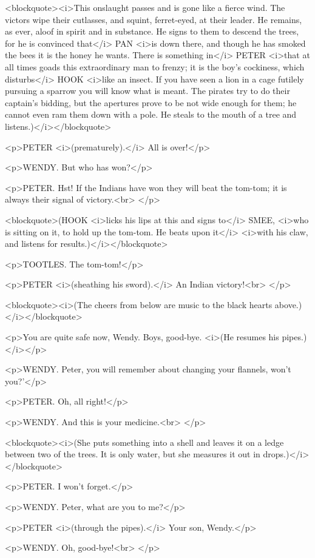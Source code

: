 <blockquote><i>This onslaught passes and is gone like a fierce wind.
The victors wipe their cutlasses, and squint, ferret-eyed, at their
leader. He remains, as ever, aloof in spirit and in substance. He
signs to them to descend the trees, for he is convinced that</i> PAN
<i>is down there, and though he has smoked the bees it is the honey
he wants. There is something in</i> PETER <i>that at all times goads
this extraordinary man to frenzy; it is the boy's cockiness, which
disturbs</i> HOOK <i>like an insect. If you have seen a lion in a
cage futilely pursuing a sparrow you will know what is meant. The
pirates try to do their captain's bidding, but the apertures prove to
be not wide enough for them; he cannot even ram them down with a
pole. He steals to the mouth of a tree and listens.)</i></blockquote>

<p>PETER <i>(prematurely).</i> All is over!</p>

<p>WENDY. But who has won?</p>

<p>PETER. Hst! If the Indians have won they will beat the tom-tom; it
is always their signal of victory.<br>
</p>

<blockquote>(HOOK <i>licks his lips at this and signs to</i> SMEE,
<i>who is sitting on it, to hold up the tom-tom. He beats upon it</i>
<i>with his claw, and listens for results.)</i></blockquote>

<p>TOOTLES. The tom-tom!</p>

<p>PETER <i>(sheathing his sword).</i> An Indian victory!<br>
</p>

<blockquote><i>(The cheers from below are music to the black hearts
above.)</i></blockquote>

<p>You are quite safe now, Wendy. Boys, good-bye. <i>(He resumes his
pipes.)</i></p>

<p>WENDY. Peter, you will remember about changing your flannels,
won't you?'</p>

<p>PETER. Oh, all right!</p>

<p>WENDY. And this is your medicine.<br>
</p>

<blockquote><i>(She puts something into a shell and leaves it on a
ledge between two of the trees. It is only water, but she measures it
out in drops.)</i></blockquote>

<p>PETER. I won't forget.</p>

<p>WENDY. Peter, what are you to me?</p>

<p>PETER <i>(through the pipes).</i> Your son, Wendy.</p>

<p>WENDY. Oh, good-bye!<br>
</p>

